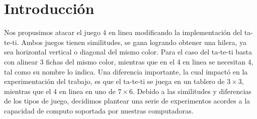 \section{Introducción}

Nos propusimos atacar el juego 4 en linea modificando la implementación del ta-te-ti.
Ambos juegos tienen similitudes, se gana logrando obtener una hilera, ya sea horizontal vertical o diagonal del mismo color.
Para el caso del ta-te-ti basta con alinear 3 fichas del mismo color, mientras que en el 4 en linea se necesitan 4, tal como su nombre
lo indica. Una diferencia importante, la cual impactó en la experimentación del trabajo,
es que el ta-te-ti se juega en un tablero de $3\times3$, mientras que el 4 en linea en uno de $7\times6$.
Debido a las similitudes y diferencias de los tipos de juego, decidimos plantear una serie de experimentos acordes a la capacidad de computo soportada
por nuestras computadoras.
%
%
%
%
%
%
%
%
